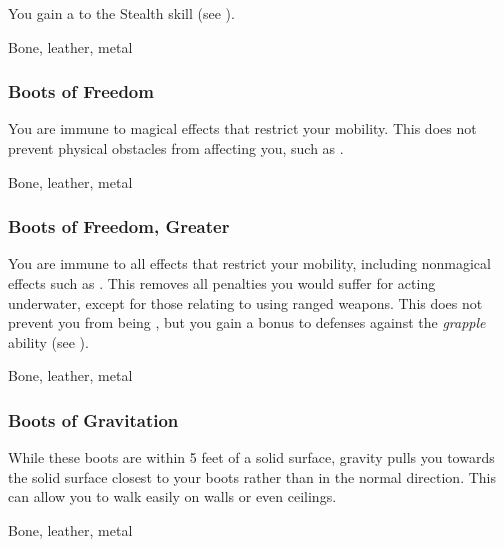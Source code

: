 You gain a   to the Stealth skill (see ).



 Bone, leather, metal


\lowercase{\hypertarget{item:Boots of Freedom}{}}\label{item:Boots of Freedom}
\hypertarget{item:Boots of Freedom}{\subsubsection{Boots of Freedom\hfill{}}}

You are immune to magical effects that restrict your mobility.
This does not prevent physical obstacles from affecting you, such as .



 Bone, leather, metal


\lowercase{\hypertarget{item:Boots of Freedom, Greater}{}}\label{item:Boots of Freedom, Greater}
\hypertarget{item:Boots of Freedom, Greater}{\subsubsection{Boots of Freedom, Greater\hfill{}}}

You are immune to all effects that restrict your mobility, including nonmagical effects such as .
This removes all penalties you would suffer for acting underwater, except for those relating to using ranged weapons.
This does not prevent you from being \grappled, but you gain a  bonus to defenses against the \textit{grapple} ability (see ).



 Bone, leather, metal


\lowercase{\hypertarget{item:Boots of Gravitation}{}}\label{item:Boots of Gravitation}
\hypertarget{item:Boots of Gravitation}{\subsubsection{Boots of Gravitation\hfill{}}}

While these boots are within 5 feet of a solid surface, gravity pulls you towards the solid surface closest to your boots rather than in the normal direction.
This can allow you to walk easily on walls or even ceilings.



 Bone, leather, metal


